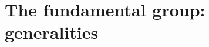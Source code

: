 \documentclass[../main.tex]{subfiles}
\begin{document}
\setcounter{chapter}{4}
\chapter{The fundamental group: generalities}
\end{document}
